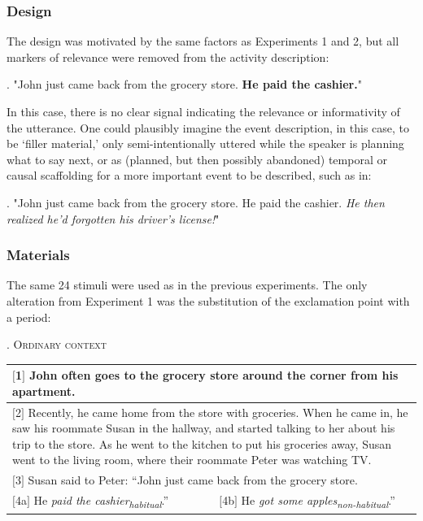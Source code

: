 \documentclass{sp}\usepackage[]{graphicx}\usepackage[]{color}
\begin{document}
\subsubsection{Design}

The design was motivated by the same factors as Experiments 1 and 2, but all markers of relevance were removed from the activity description: 

\ex. "John just came back from the grocery store.  \textbf{He paid the cashier.}"

In this case, there is no clear signal indicating the relevance or informativity of the utterance. One could plausibly imagine the event description, in this case, to be `filler material,' only semi-intentionally uttered while the speaker is planning what to say next, or as (planned, but then possibly abandoned) temporal or causal scaffolding for a more important event to be described, such as in:

\ex.\label{anchor} "John just came back from the grocery store.  He paid the cashier.  \textit{He then realized he'd forgotten his driver's license!}"

\subsubsection{Materials}

The same 24 stimuli were used as in the previous experiments. The only alteration from Experiment 1 was the substitution of the exclamation point with a period: 

\ex.\label{ex:habitual3} \centering\textsc{Ordinary context}
\vspace{-0.1cm}
\centering

\begin{longtable}{p{}|p{}}
\multicolumn{2}{p{0.9\textwidth}}{$[$1$]$ John often goes to the grocery store around the corner from his apartment.} \\
\hline
\multicolumn{2}{p{0.9\textwidth}}{$[$2$]$ Recently, he came home from the store with groceries.  When he came in, he saw his roommate Susan in the hallway, and started talking to her about his trip to the store.  As he went to the kitchen to put his groceries away, Susan went to the living room, where their roommate Peter was watching TV.} \\
\hline
\multicolumn{2}{p{0.9\textwidth}}{$[$3$]$ Susan said to Peter: ``John just came back from the grocery store.} \\
\hline
$[$4a$]$ He \textit{paid the \mbox{cashier\textsubscript{habitual}}}.'' & $[$4b$]$ He \textit{got some apples\textsubscript{non-habitual}}.''
\end{longtable}
\addtocounter{table}{-1}
\end{document}
